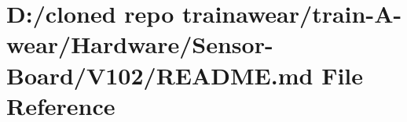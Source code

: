 \hypertarget{_hardware_2_sensor-_board_2_v102_2_r_e_a_d_m_e_8md}{}\section{D\+:/cloned repo trainawear/train-\/\+A-\/wear/\+Hardware/\+Sensor-\/\+Board/\+V102/\+R\+E\+A\+D\+ME.md File Reference}
\label{_hardware_2_sensor-_board_2_v102_2_r_e_a_d_m_e_8md}
